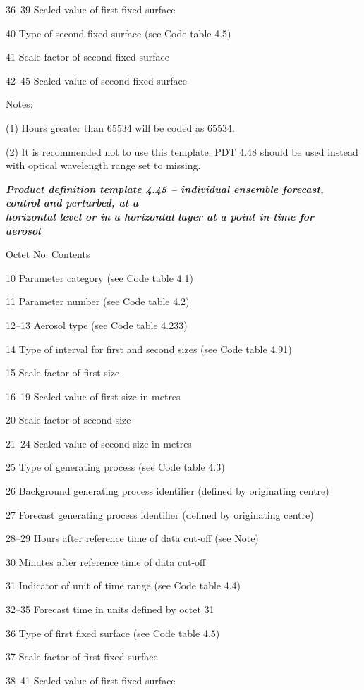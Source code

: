 36--39 Scaled value of first fixed surface

40 Type of second fixed surface (see Code table 4.5)

41 Scale factor of second fixed surface

42--45 Scaled value of second fixed surface

Notes:

(1) Hours greater than 65534 will be coded as 65534.

(2) It is recommended not to use this template. PDT 4.48 should be used instead with optical wavelength range set to missing.

\emph{\textbf{Product definition template 4.45 -- individual ensemble forecast, control and perturbed, at a\\
horizontal level or in a horizontal layer at a point in time for\\
aerosol}}

Octet No. Contents

10 Parameter category (see Code table 4.1)

11 Parameter number (see Code table 4.2)

12--13 Aerosol type (see Code table 4.233)

14 Type of interval for first and second sizes (see Code table 4.91)

15 Scale factor of first size

16--19 Scaled value of first size in metres

20 Scale factor of second size

21--24 Scaled value of second size in metres

25 Type of generating process (see Code table 4.3)

26 Background generating process identifier (defined by originating centre)

27 Forecast generating process identifier (defined by originating centre)

28--29 Hours after reference time of data cut-off (see Note)

30 Minutes after reference time of data cut-off

31 Indicator of unit of time range (see Code table 4.4)

32--35 Forecast time in units defined by octet 31

36 Type of first fixed surface (see Code table 4.5)

37 Scale factor of first fixed surface

38--41 Scaled value of first fixed surface

